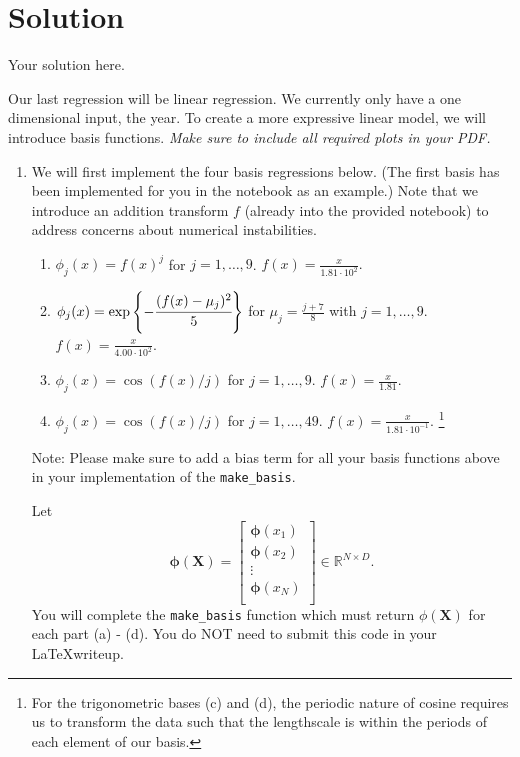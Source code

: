 \documentclass[submit]{harvardml}
\newenvironment{solution}
  {\color{blue}\section*{Solution}}
{}
\begin{document}
\begin{solution}
	Your solution here.
\end{solution}



\newpage
\begin{problem}

Our last regression will be linear regression.  We currently only have
a one dimensional input, the year.  To create a more expressive linear
model, we will introduce basis functions.
\vspace{1em}
\noindent\emph{Make sure to include all required plots in your PDF.}

\begin{enumerate}
\item 
We will first implement the four basis regressions below. (The first basis has been implemented for you in the notebook as an example.) Note that we introduce an addition transform $f$ (already into the provided notebook) to address concerns about numerical instabilities.
\begin{enumerate}
  \item $\phi_j(x)= f(x)^j$ for $j=1,\ldots, 9$. $f(x) = \frac{x}{1.81 \cdot 10^{2}}.$
  \item $\phi_j(x) = \exp\left\{-\cfrac{(f(x)-\mu_j)^2}{5}\right\}$ for $\mu_j=\frac{j + 7}{8}$ with $j=1,\ldots, 9$. $f(x) = \frac{x}{4.00 \cdot 10^{2}}.$
  \item $\phi_j(x) =  \cos(f(x) / j)$ for $j=1, \ldots, 9$. $f(x) = \frac{x}{1.81}$.
  \item $\phi_j(x) = \cos(f(x) / j)$ for $j=1, \ldots, 49$. $f(x) = \frac{x}{1.81 \cdot 10^{-1}}$. \footnote{For the trigonometric bases (c) and (d), the periodic nature of
cosine requires us to transform the data such that the 
lengthscale is within the periods of each element of our basis.}
\end{enumerate}

{\footnotesize * Note: Please make sure to add a bias term for
all your basis functions above in your implementation of the 
\verb|make_basis|.}

Let 
$$ \mathbf{\phi}(\mathbf{X}) = 
\begin{bmatrix} 
\mathbf{\phi}(x_1) \\
\mathbf{\phi}(x_2) \\
\vdots \\
\mathbf{\phi}(x_N) \\
\end{bmatrix} \in \mathbb{R}^{N\times D}.$$
You will complete the \verb|make_basis| function which must return
$\phi(\mathbf{X})$ for each part 
(a) - (d). You do NOT need to submit this
code in your \LaTeX writeup.


\end{enumerate}
\end{problem}
\end{document}
